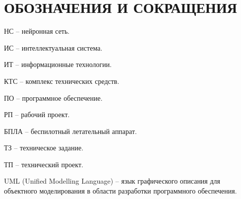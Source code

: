 \section*{ОБОЗНАЧЕНИЯ И СОКРАЩЕНИЯ}

НС -- нейронная сеть.

ИС -- интеллектуальная система.

ИТ -- информационные технологии. 

КТС -- комплекс технических средств.

ПО -- программное обеспечение.

РП -- рабочий проект.

БПЛА -- беспилотный летательный аппарат.

ТЗ -- техническое задание.

ТП -- технический проект.

UML (Unified Modelling Language) -- язык графического описания для объектного моделирования в области разработки программного обеспечения.
